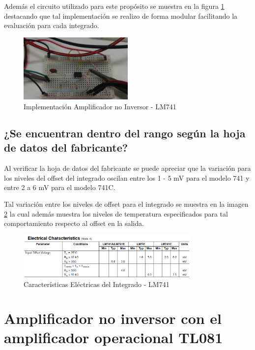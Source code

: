Además el circuito utilizado para este propósito se muestra en la figura \ref{fig:implementacion-lm741} destacando que tal implementación se realizo de forma modular facilitando la evaluación para cada integrado.

\begin{figure}[h]
	\centering
	\includegraphics[width=0.5\textwidth]{media/implementacion-lm741}
	\caption{Implementación Amplificador no Inversor - LM741}
	\label{fig:implementacion-lm741}
\end{figure}

\subsection{¿Se encuentran dentro del rango según la hoja de datos del fabricante?}
Al verificar la hoja de datos del fabricante se puede apreciar que la variación para los niveles del offset del integrado oscilan entre los 1 - 5 mV para el modelo 741 y entre 2 a 6 mV para el modelo 741C.

Tal variación entre los niveles de offset para el integrado se muestra en la imagen \ref{fig:offset-datasheet-lm741} la cual además muestra los niveles de temperatura especificados para tal comportamiento respecto al offset en la salida.

\begin{figure}[h]
	\centering
	\includegraphics[width=0.8\textwidth]{media/offset-datasheet-lm741}
	\caption{Características Eléctricas del Integrado - LM741}
	\label{fig:offset-datasheet-lm741}
\end{figure}

\section{Amplificador no inversor con el amplificador operacional TL081}

